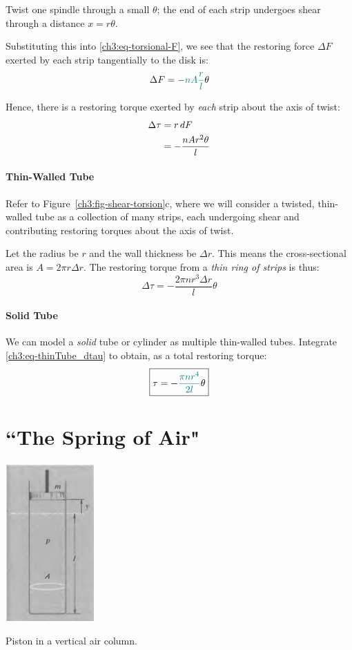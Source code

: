 Twist one spindle through a small $\theta$; the end of each strip undergoes shear through a distance $x=r\theta$. 

Substituting this into \eqref{ch3:eq-torsional-F}, we see that the restoring force $\Delta F$ exerted by each strip tangentially to the disk is:
\[ \Delta F = -\textcolor{teal}{nA\frac{r}{l}} \theta \]

Hence, there is a restoring torque exerted by \emph{each} strip about the axis of twist:
\begin{align*}
	\Delta\tau &= r\,dF  \notag \\
	&= -\frac{nAr^2\theta}{l} 
\end{align*}

\paragraph{Thin-Walled Tube}
Refer to Figure~\ref{ch3:fig-shear-torsion}c, where we will consider a twisted, thin-walled tube as a collection of many strips, each undergoing shear and contributing restoring torques about the axis of twist.

Let the radius be $r$ and the wall thickness be $\Delta r$. This means the cross-sectional area is $A=2\pi r \Delta r$. The restoring torque from a \emph{thin ring of strips} is thus:
\begin{equation}
\Delta \tau = -\frac{2\pi nr^3\Delta r}{l} \theta  \label{ch3:eq-thinTube_dtau}
\end{equation}

\paragraph{Solid Tube}
We can model a \textit{solid} tube or cylinder as multiple thin-walled tubes. Integrate \eqref{ch3:eq-thinTube_dtau} to obtain, as a total restoring torque:
\begin{equation*}
	\boxed{\tau = -\textcolor{teal}{\frac{\pi nr^4}{2l}} \theta}
\end{equation*}

\section{``The Spring of Air"} \label{ch3:sec-air}

\begin{marginfigure}
	\centering
	\includegraphics[scale=0.8]{phys232/Ch3-air.png}
	\caption{Piston in a vertical air column.}
	\label{ch3:fig-air}
\end{marginfigure}

